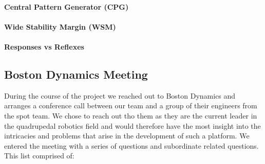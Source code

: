            \paragraph{Central Pattern Generator (CPG)}

            \paragraph{Wide Stability Margin (WSM)}
                
            \paragraph{Responses vs Reflexes}

    \subsection{Boston Dynamics Meeting} %
        During the course of the project we reached out to Boston Dynamics and arranges a conference call between our team and a group of their engineers from the spot team. We chose to reach out tho them as they are the current leader in the quadrupedal robotics field and would therefore have the most insight into the intricacies and problems that arise in the development of such a platform. We entered the meeting with a series of questions and subordinate related questions. This list comprised of:
